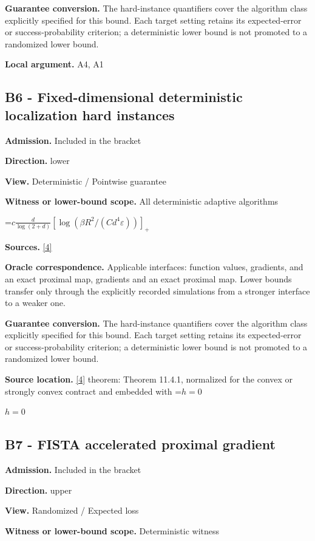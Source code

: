 \documentclass[10pt,a4paper]{article}
\newcommand{\AtlasMath}[1]{\par\begingroup\centering\setbox0=\hbox{$\displaystyle #1$}\ifdim\wd0>1.4\linewidth\typeout{ATLAS WIDE FORMULA: \the\wd0}\fi\ifdim\wd0>\linewidth\resizebox{\linewidth}{!}{\box0}\else\box0\fi\par\endgroup}
\newcommand{\AtlasInlineMath}[1]{\begingroup\setbox0=\hbox{$#1$}\ifdim\wd0>.4\linewidth\endgroup\AtlasMath{#1}\else\endgroup$#1$\fi}
\begin{document}
\textbf{Guarantee conversion.} The hard-instance quantifiers cover the algorithm class explicitly specified for this bound. Each target setting retains its expected-error or success-probability criterion; a deterministic lower bound is not promoted to a randomized lower bound.

\textbf{Local argument.} A4, A1

\subsection{B6 - Fixed-dimensional deterministic localization hard instances}
\textbf{Admission.} Included in the bracket

\textbf{Direction.} lower

\textbf{View.} Deterministic / Pointwise guarantee

\textbf{Witness or lower-bound scope.} All deterministic adaptive algorithms

\AtlasMath{c\frac d{\log(2+d)}[\log(\beta R^2/(Cd^4\varepsilon))]_+}
\textbf{Sources.} \href{https://www2.isye.gatech.edu/~nemirovs/LecEMCO.pdf}{[4]}

\textbf{Oracle correspondence.} Applicable interfaces: function values, gradients, and an exact proximal map, gradients and an exact proximal map. Lower bounds transfer only through the explicitly recorded simulations from a stronger interface to a weaker one.

\textbf{Guarantee conversion.} The hard-instance quantifiers cover the algorithm class explicitly specified for this bound. Each target setting retains its expected-error or success-probability criterion; a deterministic lower bound is not promoted to a randomized lower bound.

\textbf{Source location.} \href{https://www2.isye.gatech.edu/~nemirovs/LecEMCO.pdf}{[4]} theorem: Theorem 11.4.1, normalized for the convex or strongly convex contract and embedded with \AtlasInlineMath{h=0}

\subsection{B7 - FISTA accelerated proximal gradient}
\textbf{Admission.} Included in the bracket

\textbf{Direction.} upper

\textbf{View.} Randomized / Expected loss

\textbf{Witness or lower-bound scope.} Deterministic witness
\end{document}
